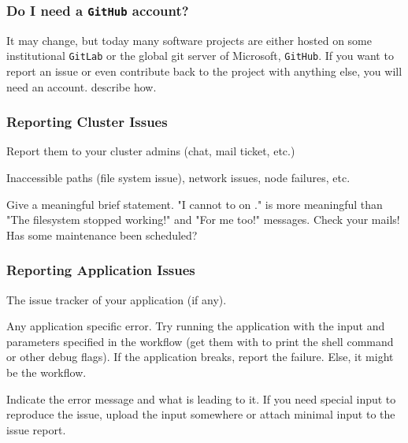 \begin{frame}
  \frametitle{Do I need a \texttt{GitHub} account?}
  It may change, but today many software projects are either hosted on some institutional \texttt{GitLab} or the global git server of Microsoft, \texttt{GitHub}.\newline
  If you want to report an issue or even contribute back to the project with anything else, you will need an account.  describe how. 
\end{frame}

\begin{frame}
	\frametitle{Reporting Cluster Issues}
	\begin{question}[Where to?]
	  Report them to your cluster admins (chat, mail ticket, etc.)
	\end{question}
    \pause
    \begin{question}[What?]
      Inaccessible paths (file system issue), network issues, node failures, etc. 
    \end{question}
    \pause
    \begin{question}[How?]
      Give a meaningful brief statement. "I cannot to  on ." is more meaningful than "The filesystem stopped working!" and "For me too!" messages.\newline
      \bcattention Check your mails! Has some maintenance been scheduled?
    \end{question}	
\end{frame}

\begin{frame}
	\frametitle{Reporting Application Issues}
	\begin{question}[Where to?]
		The issue tracker of your application (if any). 
	\end{question}
	\pause
	\begin{question}[What?]
		Any application specific error. Try running the application with the input and parameters specified in the workflow (get them with  to print the shell command or other debug flags). If the application breaks, report the failure. Else, it might be the workflow.
	\end{question}
	\pause
	\begin{question}[How?]
		Indicate the error message and what is leading to it. If you need special input to reproduce the issue, upload the input somewhere or attach minimal input to the issue report.
	\end{question}
\end{frame}

